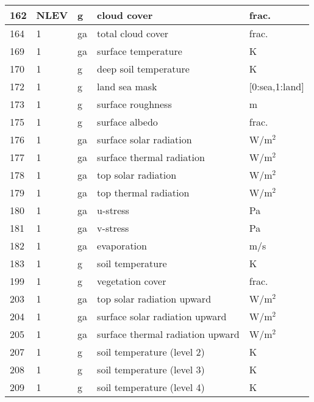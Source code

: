 \begin{center}
\begin{tabular}[t]{|l|l|l|l|l|}
162 & NLEV & g  & cloud cover                      & frac.           \\ \hline
164 & 1    & ga & total cloud cover                & frac.           \\ \hline
169 & 1    & ga & surface temperature              & K               \\ \hline
170 & 1    & g  & deep soil temperature            & K               \\ \hline
172 & 1    & g  & land sea mask                    & [0:sea,1:land]   \\ \hline
173 & 1    & g  & surface roughness                & m               \\ \hline
175 & 1    & g  & surface albedo                   & frac.           \\ \hline
176 & 1    & ga & surface solar radiation          & W/m$^{2}$       \\ \hline
177 & 1    & ga & surface thermal radiation        & W/m$^{2}$       \\ \hline
178 & 1    & ga & top solar radiation              & W/m$^{2}$       \\ \hline
179 & 1    & ga & top thermal radiation            & W/m$^{2}$       \\ \hline
180 & 1    & ga & u-stress                         & Pa              \\ \hline
181 & 1    & ga & v-stress                         & Pa              \\ \hline
182 & 1    & ga & evaporation                      & m/s             \\ \hline
183 & 1    & g  & soil temperature                 & K               \\ \hline
199 & 1    & g  & vegetation cover                 & frac.           \\ \hline
203 & 1    & ga & top solar radiation upward       & W/m$^{2}$       \\ \hline
204 & 1    & ga & surface solar radiation upward   & W/m$^{2}$       \\ \hline
205 & 1    & ga & surface thermal radiation upward & W/m$^{2}$       \\ \hline
207 & 1    & g  & soil temperature (level 2)       & K               \\ \hline
208 & 1    & g  & soil temperature (level 3)       & K               \\ \hline
209 & 1    & g  & soil temperature (level 4)       & K               \\ \hline

\end{tabular}
\end{center}
